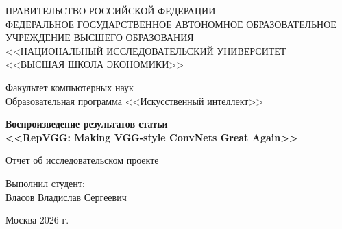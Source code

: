\documentclass[12pt,a4paper]{article}
\begin{document}
\thispagestyle{empty}
\onehalfspacing

\begin{center}
ПРАВИТЕЛЬСТВО РОССИЙСКОЙ ФЕДЕРАЦИИ\\[0.5em]
ФЕДЕРАЛЬНОЕ ГОСУДАРСТВЕННОЕ АВТОНОМНОЕ ОБРАЗОВАТЕЛЬНОЕ\\
УЧРЕЖДЕНИЕ ВЫСШЕГО ОБРАЗОВАНИЯ\\[0.5em]
<<НАЦИОНАЛЬНЫЙ ИССЛЕДОВАТЕЛЬСКИЙ УНИВЕРСИТЕТ\\
<<ВЫСШАЯ ШКОЛА ЭКОНОМИКИ>>\\
\end{center}

\vspace{10mm}

\begin{center}
Факультет компьютерных наук\\
Образовательная программа <<Искусственный интеллект>>\\
\end{center}

\vspace{15mm}

\begin{center}
\textbf{\Large Воспроизведение результатов статьи}\\[0.7em]
\textbf{\Large <<RepVGG: Making VGG-style ConvNets Great Again>>}\\
\end{center}

\vspace{10mm}

\begin{center}
Отчет об исследовательском проекте\\
\end{center}

\vspace{20mm}

\begin{flushright}
\begin{minipage}{0.45\textwidth}
Выполнил студент:\\
Власов Владислав Сергеевич\\
\end{minipage}
\end{flushright}

\vfill

\begin{center}
Москва 2026 г.
\end{center}

\clearpage
\end{document}
